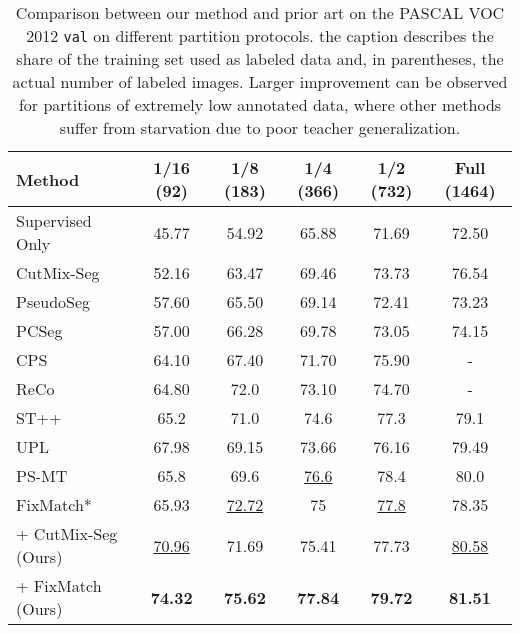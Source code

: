 \documentclass{article}
\renewcommand{\cite}[1]{\citep{#1}}
\begin{document}
\begin{table*}[t]
\centering
\caption{
Comparison between our method and prior art on the PASCAL VOC 2012 \texttt{val} on different partition protocols. the caption describes the share of the training set used as labeled data and, in parentheses, the actual number of labeled images. Larger improvement can be observed for partitions of extremely low annotated data, where other methods suffer from starvation due to poor teacher generalization.}
\label{tab:pascal_with_fix}
\begin{tabular}{lccccc}
\toprule
\textbf{Method} & 
\textbf{1/16 (92)} & \textbf{1/8 (183)} & \textbf{1/4 (366)} & \textbf{1/2 (732)} & \textbf{Full (1464)} \\
\midrule
Supervised Only & 45.77 & 54.92 & 65.88 & 71.69 &72.50 \\
\midrule
CutMix-Seg \cite{french2019semi} & 52.16 & 63.47 & 69.46 & 73.73 & 76.54 \\
PseudoSeg \cite{pseudoseg} & 57.60 & 65.50 & 69.14 & 72.41 & 73.23 \\
PCSeg \cite{pc2seg} & 57.00 & 66.28 & 69.78 & 73.05 & 74.15 \\
CPS \cite{cps} & 64.10 & 67.40 & 71.70 & 75.90 & - \\
ReCo \cite{reco} & 64.80 & 72.0 & 73.10 & 74.70 & - \\
ST++ \cite{st++} & 65.2 & 71.0 & 74.6 & 77.3 & 79.1 \\
UPL  \cite{wang2022semi} & 67.98 & 69.15 & 73.66 & 76.16 & 79.49 \\
PS-MT \cite{psmt} & 65.8 & 69.6 & \underline{76.6} & 78.4 & 80.0 \\
FixMatch* \cite{Rabadan2022DenseFA} & 65.93 & \underline{72.72} & 75 & \underline{77.8} & 78.35 \\



\midrule
\methodname{} + CutMix-Seg (Ours) &
 \underline{70.96} & 71.69 & 75.41 & 77.73 & \underline{80.58} \\ 

\methodname{} + FixMatch (Ours) &
\textbf{74.32} & \textbf{75.62} & \textbf{77.84} & \textbf{79.72} & \textbf{81.51} \\ 

\bottomrule
\end{tabular}
\end{table*}
\end{document}
